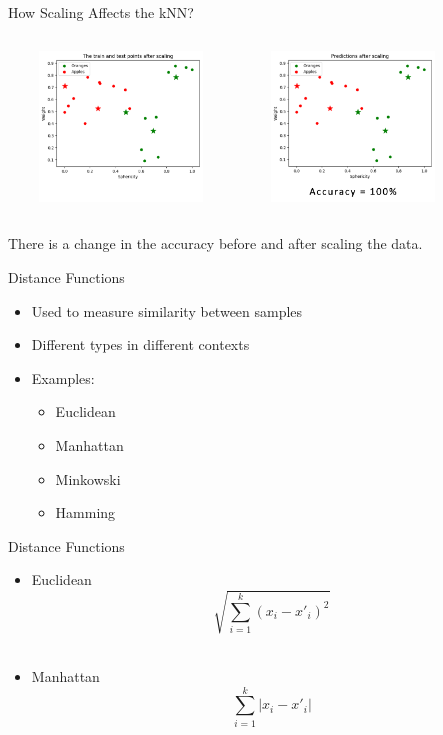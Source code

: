 \documentclass[aspectratio=169,14pt,usenames,dvipsnames]{beamer}
\begin{document}
\begin{frame}[t]{How Scaling Affects the kNN?}
\begin{columns}
\includegraphics[width=6cm, height=4cm]{Images/13aknn.png}
\includegraphics[width=6cm, height=4cm]{Images/14aknn.png}
\end{columns}

\vspace{0.5cm}\centering
\small {There is a change in the accuracy before and  after scaling the data.}
\end{frame}

\begin{frame}{Distance Functions}
\begin{itemize}
\item Used to measure similarity between samples
\item Different types in different contexts
\item Examples:
	\begin{itemize}
		\item Euclidean 
		\item Manhattan 
		\item Minkowski 
		\item Hamming
	\end{itemize}
\end{itemize}
\end{frame}

\begin{frame}{Distance Functions}
\centering
\begin{itemize}
	\item \small{Euclidean $$\sqrt{\sum_{i=1}^k{(x_i - x'_i)^2}}$$ } \\[2pt]
	\item \small{Manhattan $$\sum_{i=1}^k{|x_i - x'_i|}$$}
\end{itemize}
\end{frame}
\end{document}
